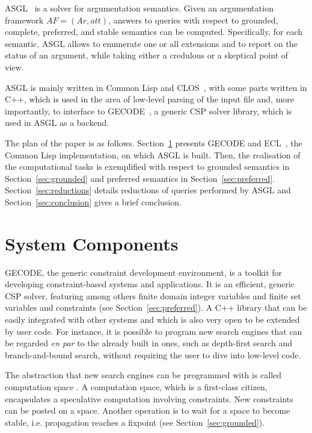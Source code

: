 \documentclass[runningheads,a4paper]{llncs}
\begin{document}
ASGL~\cite{asgl} is a solver for argumentation semantics. Given an
argumentation framework $AF = (Ar, att)$, answers to queries with
respect to grounded, complete, preferred, and stable semantics can be
computed. Specifically, for each semantic, ASGL allows to enumerate
one or all extensions and to report on the status of an argument,
while taking either a credulous or a skeptical point of view.

ASGL is mainly written in Common Lisp and CLOS~\cite{Steele:1990:CLL},
with some parts written in C++, which is used in the area of low-level
parsing of the input file and, more importantly, to interface to
GECODE~\cite{gecode}, a generic CSP solver library, which is used in ASGL as a
backend.

The plan of the paper is as follows. Section~\ref{sec:components}
presents GECODE and ECL~\cite{ecl}, the Common Lisp implementation, on
which ASGL is built. Then, the realisation of the computational tasks
is exemplified with respect to grounded semantics in
Section~\ref{sec:grounded} and preferred semantics in
Section~\ref{sec:preferred}. Section~\ref{sec:reductions} details
reductions of queries performed by ASGL and
Section~\ref{sec:conclusion} gives a brief conclusion.

\section{System Components}\label{sec:components}

GECODE, the generic constraint development environment,
is a toolkit for developing constraint-based systems and
applications. It is an efficient, generic CSP solver, featuring among
others finite domain integer variables and finite set variables and
constraints (see Section~\ref{sec:preferred}). A C++ library that can
be easily integrated with other systems and which is also very open to
be extended by user code. For instance, it is possible to program new
search engines that can be regarded \textit{en par} to the already
built in ones, such as depth-first search and branch-and-bound search,
without requiring the user to dive into low-level code.

The abstraction that new search engines can be programmed with is
called computation space \cite{Engines:97}. A computation space, which
is a first-class citizen, encapsulates a speculative computation
involving constraints. New constraints can be posted on a
space. Another operation is to wait for a space to become stable,
i.e. propagation reaches a fixpoint (see Section~\ref{sec:grounded}).
\end{document}
